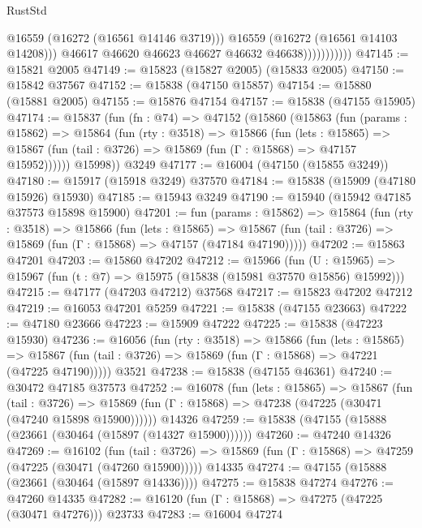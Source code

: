 \begin{lexlean}{RustStd}
\begin{coremodule}
                              @16559
                              (@16272 (@16561 @14146 @3719)))
                            @16559
                            (@16272 (@16561 @14103 @14208)))
                          @46617
                          @46620
                          @46623
                          @46627
                          @46632
                          @46638)))))))))))
@47145 := @15821 @2005
@47149 := @15823 (@15827 @2005) (@15833 @2005)
@47150 := @15842 @37567
@47152 := @15838 (@47150 @15857)
@47154 := @15880 (@15881 @2005)
@47155 := @15876 @47154
@47157 := @15838 (@47155 @15905)
@47174 := @15837
    (fun (fn : @74) =>
    @47152
      (@15860
        (@15863
          (fun (params : @15862) =>
          @15864
            (fun (rty : @3518) =>
            @15866
              (fun (lets : @15865) =>
              @15867 (fun (tail : @3726) => @15869 (fun (Γ : @15868) => @47157 @15952))))))
        @15998))
    @3249
@47177 := @16004 (@47150 (@15855 @3249))
@47180 := @15917 (@15918 @3249) @37570
@47184 := @15838 (@15909 (@47180 @15926) @15930)
@47185 := @15943 @3249
@47190 := @15940 (@15942 @47185 @37573 @15898 @15900)
@47201 := fun (params : @15862) =>
  @15864
    (fun (rty : @3518) =>
    @15866
      (fun (lets : @15865) =>
      @15867 (fun (tail : @3726) => @15869 (fun (Γ : @15868) => @47157 (@47184 @47190)))))
@47202 := @15863 @47201
@47203 := @15860 @47202
@47212 := @15966
    (fun (U : @15965) => @15967 (fun (t : @7) => @15975 (@15838 (@15981 @37570 @15856) @15992)))
@47215 := @47177 (@47203 @47212) @37568
@47217 := @15823 @47202 @47212
@47219 := @16053 @47201 @5259
@47221 := @15838 (@47155 @23663)
@47222 := @47180 @23666
@47223 := @15909 @47222
@47225 := @15838 (@47223 @15930)
@47236 := @16056
    (fun (rty : @3518) =>
    @15866
      (fun (lets : @15865) =>
      @15867 (fun (tail : @3726) => @15869 (fun (Γ : @15868) => @47221 (@47225 @47190)))))
    @3521
@47238 := @15838 (@47155 @46361)
@47240 := @30472 @47185 @37573
@47252 := @16078
    (fun (lets : @15865) =>
    @15867
      (fun (tail : @3726) =>
      @15869 (fun (Γ : @15868) => @47238 (@47225 (@30471 (@47240 @15898 @15900))))))
    @14326
@47259 := @15838 (@47155 (@15888 (@23661 (@30464 (@15897 (@14327 @15900))))))
@47260 := @47240 @14326
@47269 := @16102
    (fun (tail : @3726) => @15869 (fun (Γ : @15868) => @47259 (@47225 (@30471 (@47260 @15900)))))
    @14335
@47274 := @47155 (@15888 (@23661 (@30464 (@15897 @14336))))
@47275 := @15838 @47274
@47276 := @47260 @14335
@47282 := @16120 (fun (Γ : @15868) => @47275 (@47225 (@30471 @47276))) @23733
@47283 := @16004 @47274

\end{coremodule}
\end{lexlean}
